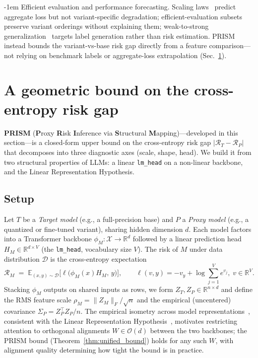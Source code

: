 \documentclass{article}
\makeatletter
\newlength{\paraSpace}
\renewcommand{\paragraph}{\@startsection{paragraph}{4}{\z@}%
  {\paraSpace}{-1em}%
  {\normalfont\normalsize\bfseries}}
\makeatother
\begin{document}
\paragraph{Efficient evaluation and performance forecasting.}
Scaling laws~\cite{kaplan2020scaling, hoffmann2022training} predict aggregate loss but not variant-specific degradation; efficient-evaluation subsets~\cite{polo2024tinybenchmarks, perlitz2024efficient} preserve variant orderings without explaining them; weak-to-strong generalization~\cite{burns2023weak} targets label generation rather than risk estimation. PRISM instead bounds the variant-vs-base risk gap directly from a feature comparison---not relying on benchmark labels or aggregate-loss extrapolation (Sec.~\ref{sec:geometric_foundation}).



\section{A geometric bound on the cross-entropy risk gap}
\label{sec:geometric_foundation}

\textbf{PRISM} (\textbf{P}roxy \textbf{R}isk \textbf{I}nference via \textbf{S}tructural \textbf{M}apping)---developed in this section---is a closed-form upper bound on the cross-entropy risk gap $|\mathcal{R}_T - \mathcal{R}_P|$ that decomposes into three diagnostic axes (scale, shape, head). We build it from two structural properties of LLMs: a linear \texttt{lm\_head} on a non-linear backbone, and the Linear Representation Hypothesis.

\subsection{Setup}
\label{subsec:problem_setup}

Let $T$ be a \emph{Target model} (e.g., a full-precision base) and $P$ a \emph{Proxy model} (e.g., a quantized or fine-tuned variant), sharing hidden dimension $d$. Each model factors into a Transformer backbone $\phi_M: \mathcal{X} \to \mathbb{R}^d$ followed by a linear prediction head $H_M \in \mathbb{R}^{d \times V}$ (the \texttt{lm\_head}, vocabulary size $V$). The risk of $M$ under data distribution $\mathcal{D}$ is the cross-entropy expectation
\begin{equation}
\label{eq:ce_def}
\mathcal{R}_M \;=\; \mathbb{E}_{(x,y) \sim \mathcal{D}}\!\big[\ell\big(\phi_M(x) H_M,\, y\big)\big], \qquad \ell(v, y) = -v_y + \log \textstyle\sum_{j=1}^{V} e^{v_j}, \; v \in \mathbb{R}^V.
\end{equation}
Stacking $\phi_M$ outputs on shared inputs as rows, we form $Z_T, Z_P \in \mathbb{R}^{n \times d}$ and define the RMS feature scale $\rho_M = \|Z_M\|_F/\sqrt{n}$ and the empirical (uncentered) covariance $\Sigma_P = Z_P^\top Z_P/n$. The empirical isometry across model representations~\cite{moschella2022relative}, consistent with the Linear Representation Hypothesis~\cite{park2023linear}, motivates restricting attention to orthogonal alignments $W \in \mathcal{O}(d)$ between the two backbones; the PRISM bound (Theorem~\ref{thm:unified_bound}) holds for any such $W$, with alignment quality determining how tight the bound is in practice.
\end{document}
